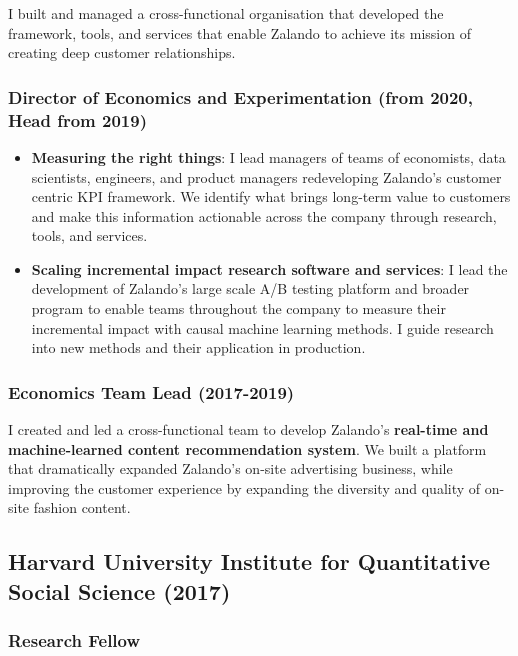 \documentclass[a4paper]{article}
\begin{document}
I built and managed a cross-functional organisation that developed the framework, tools, and services that enable Zalando to achieve its mission of creating deep customer relationships. 

\subsubsection*{Director of Economics and Experimentation (from 2020, Head from 2019)}

\begin{itemize}

  \item \textbf{Measuring the right things}: I lead managers of teams of economists, data scientists, engineers, and product managers redeveloping Zalando's customer centric KPI framework. We identify what brings long-term value to customers and make this information actionable across the company through research, tools, and services.

  \item \textbf{Scaling incremental impact research software and services}: I lead the development of Zalando's large scale A/B testing platform and broader program to enable teams throughout the company to measure their incremental impact with causal machine learning methods. I guide research into new methods and their application in production.

\end{itemize}
  
\subsubsection*{Economics Team Lead (2017-2019)}

I created and led a cross-functional team to develop Zalando's \textbf{real-time and machine-learned content recommendation system}. We built a platform that dramatically expanded Zalando's on-site advertising business, while improving the customer experience by expanding the diversity and quality of on-site fashion content.

\subsection*{Harvard University Institute for Quantitative Social Science (2017)}

\subsubsection*{Research Fellow}
\end{document}
